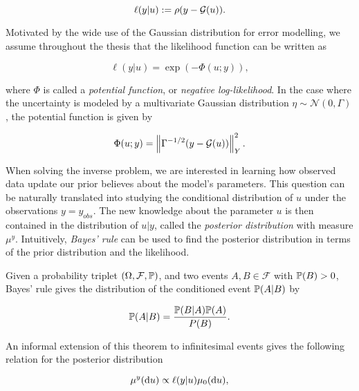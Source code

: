 \begin{equation}\label{def-ell}
  \ell(y|u) := \rho(y - \G(u)).
\end{equation}

Motivated by the wide use of the Gaussian distribution for error modelling, we assume throughout the thesis that the likelihood function can be written as

\begin{equation} \label{exponential-ell}
  \ell(y|u) = \exp(-\Phi(u;y)),
\end{equation}

where $\Phi$ is called a \textit{potential function}, or \textit{negative log-likelihood}. In the case where the uncertainty is modeled by a multivariate Gaussian distribution $\eta \sim \mathcal{N}(0, \Gamma)$, the potential function is given by

\begin{equation} \label{gaussian-potential}
  \Phi(u; y) = \norm{\Gamma^{-1/2}(y - \G(u))}_Y^2.
\end{equation}


When solving the inverse problem, we are interested in learning how observed data update our prior believes about the model's parameters. This question can be naturally translated into studying the conditional distribution of $u$ under the observations $y = y_{obs}$. The new knowledge about the parameter $u$ is then contained in the distribution of $u|y$, called the \textit{posterior distribution} with measure $\mu^y$. Intuitively, \textit{Bayes' rule} can be used to find the posterior distribution in terms of the prior distribution and the likelihood.

Given a probability triplet $(\Omega, \mathcal{F}, \P)$, and two events $A, B \in \mathcal{F}$ with $\P(B) > 0$, Bayes' rule gives the distribution of the conditioned event $\P(A|B)$ by

\begin{equation*}
  \P(A|B) = \frac{\P(B|A)\P(A)}{P(B)}.
\end{equation*}

An informal extension of this theorem to infinitesimal events gives the following relation for the posterior distribution

\begin{equation*}\label{bayes-rule}
  \mu^y(\text{d}u) \propto \ell(y|u)\mu_0(\d u),
\end{equation*}

